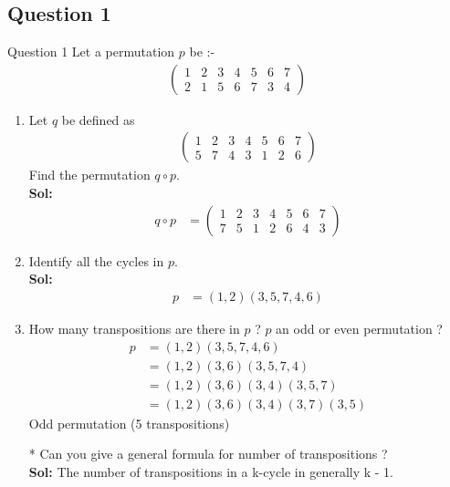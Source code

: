 \documentclass[xcolor=svgnames]{beamer}
\begin{document}
\subsection{Question 1}
\begin{frame}{Question 1}
    Let a permutation $p$ be :- 
    \begin{align*}
        \begin{pmatrix}
        1 & 2 & 3 & 4 & 5 & 6 & 7\\ 2 & 1 & 5 & 6 & 7 & 3 & 4
        \end{pmatrix}
    \end{align*}
    \begin{enumerate}
        \item Let $q$ be defined as 
        \begin{align*}
        \begin{pmatrix}
        1 & 2 & 3 & 4 & 5 & 6 & 7\\ 5 & 7 & 4 & 3 & 1 & 2 & 6
        \end{pmatrix}            
        \end{align*}
        Find the permutation $q \circ p$.
        \\ \textbf{Sol:}
        \begin{align*}
            q \circ p &= \begin{pmatrix} 1 & 2 & 3 & 4 & 5 & 6 & 7 \\ 
            7 & 5 & 1 & 2 & 6 & 4 & 3
            \end{pmatrix}
        \end{align*}
    \end{enumerate}
\end{frame}


\begin{frame}{}
    \begin{enumerate}\setcounter{enumi}{1}
        \item Identify all the cycles in $p$.
        \\ \textbf{Sol:} 
        \begin{align*}
            p &= (1,2)(3,5,7,4,6)
        \end{align*}
        \item How many transpositions are there in $p$ ? $p$ an odd or even permutation ? 
        \begin{align*}
             p &= (1,2)(3,5,7,4,6)
             \\ &= (1,2)(3,6)(3,5,7,4)
             \\ &= (1,2)(3,6)(3,4)(3,5,7)
             \\ &= (1,2)(3,6)(3,4)(3,7)(3,5)
        \end{align*}
        Odd permutation (5 transpositions)
        \item [*] Can you give a general formula for number of transpositions ?
        \\ \textbf{Sol:} The number of transpositions in a k-cycle in generally k - 1.
    \end{enumerate}
\end{frame}
\end{document}
